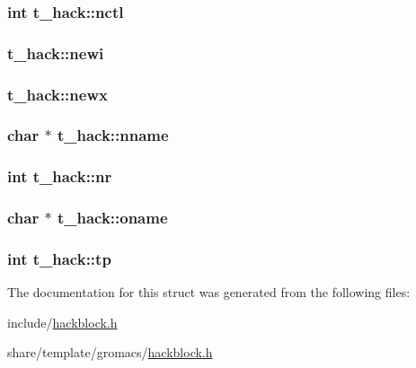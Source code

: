\hypertarget{structt__hack_ab59b7ca3a452b2557b4c95213f651b32}{
\subsubsection[{nctl}]{\setlength{\rightskip}{0pt plus 5cm}int {\bf t\-\_\-hack\-::nctl}}}\label{structt__hack_ab59b7ca3a452b2557b4c95213f651b32}
\hypertarget{structt__hack_a46d5bfb174ba965fbed42b62b2b9d1ed}{
\subsubsection[{newi}]{ {\bf t\-\_\-hack\-::newi}}}\label{structt__hack_a46d5bfb174ba965fbed42b62b2b9d1ed}
\hypertarget{structt__hack_a52af764e927fb76bb6237e49c59f10d2}{
\subsubsection[{newx}]{ {\bf t\-\_\-hack\-::newx}}}\label{structt__hack_a52af764e927fb76bb6237e49c59f10d2}
\hypertarget{structt__hack_a13142d44b982065f0551ee7bf6a5d6e0}{
\subsubsection[{nname}]{\setlength{\rightskip}{0pt plus 5cm}char $\ast$ {\bf t\-\_\-hack\-::nname}}}\label{structt__hack_a13142d44b982065f0551ee7bf6a5d6e0}
\hypertarget{structt__hack_ae8f9f581cfadd27c1c080470db018f08}{
\subsubsection[{nr}]{\setlength{\rightskip}{0pt plus 5cm}int {\bf t\-\_\-hack\-::nr}}}\label{structt__hack_ae8f9f581cfadd27c1c080470db018f08}
\hypertarget{structt__hack_a2cfd4426507fdf36e0f859c3df023d4c}{
\subsubsection[{oname}]{\setlength{\rightskip}{0pt plus 5cm}char $\ast$ {\bf t\-\_\-hack\-::oname}}}\label{structt__hack_a2cfd4426507fdf36e0f859c3df023d4c}
\hypertarget{structt__hack_a9505443c1e18327c6b2d7fa6fa2fec54}{
\subsubsection[{tp}]{\setlength{\rightskip}{0pt plus 5cm}int {\bf t\-\_\-hack\-::tp}}}\label{structt__hack_a9505443c1e18327c6b2d7fa6fa2fec54}


\-The documentation for this struct was generated from the following files\-:\begin{DoxyCompactItemize}
\item 
include/\hyperlink{include_2hackblock_8h}{hackblock.\-h}\item 
share/template/gromacs/\hyperlink{share_2template_2gromacs_2hackblock_8h}{hackblock.\-h}\end{DoxyCompactItemize}
